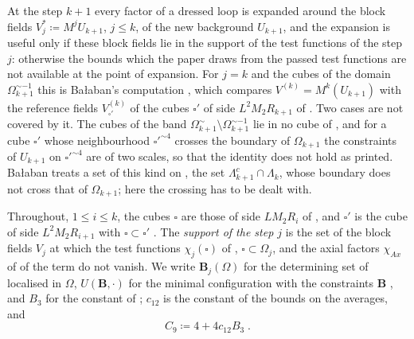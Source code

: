 \documentclass[11pt]{preprint}
\numberwithin{equation}{section}
\theoremstyle{definition}
\theoremstyle{remark}
\theoremstyle{plain}
\begin{document}
At the step $k + 1$ every factor of a dressed loop is expanded around the block fields $V^*_j \coloneqq M^jU_{k+1}$, $j \leq k$, of the new background $U_{k+1}$, and the expansion is useful only if these block fields lie in the support of the test functions of the step $j$: otherwise the bounds which the paper draws from the passed test functions are not available at the point of expansion. For $j = k$ and the cubes of the domain $\Omega_{k+1}^{\sim-1}$ this is Ba{\l}aban's computation \cite[(3.16)--(3.19), pp.~268--269]{BalabanCRE}, which compares $V^{(k)} = M^k(U_{k+1})$ with the reference fields $V^{(k)}_{\square'}$ of the cubes $\square'$ of side $L^2M_2R_{k+1}$ of \cite[(3.16)]{BalabanCRE}. Two cases are not covered by it. The cubes of the band $\Omega_{k+1}^\sim \setminus \Omega_{k+1}^{\sim-1}$ lie in no cube of \cite[(3.16)]{BalabanCRE}, and for a cube $\square'$ whose neighbourhood $\square'^{\sim4}$ crosses the boundary of $\Omega_{k+1}$ the constraints of $U_{k+1}$ on $\square'^{\sim4}$ are of two scales, so that the identity \cite[(3.17)]{BalabanCRE} does not hold as printed. Ba{\l}aban treats a set of this kind on \cite[p.~269]{BalabanCRE}, the set $\Lambda_{k+1}^c \cap \Lambda_k$, whose boundary does not cross that of $\Omega_{k+1}$; here the crossing has to be dealt with.

Throughout, $1 \leq i \leq k$, the cubes $\square$ are those of side $LM_2R_i$ of \cite[(2.17), p.~257]{BalabanCRE}, and $\square'$ is the cube of side $L^2M_2R_{i+1}$ with $\square \subset \square'$ \cite[p.~266]{BalabanCRE}. The \emph{support of the step $j$} is the set of the block fields $V_j$ at which the test functions $\chi_j(\square)$ of \cite[(2.17)]{BalabanCRE}, $\square \subset \Omega_j$, and the axial factors $\chi_{Ax}$ of \cite[(3.9), p.~266]{BalabanCRE} of the term do not vanish. We write $\mathbf B_j(\Omega)$ for the determining set of \cite[p.~256]{BalabanCRE} localised in $\Omega$, $U(\mathbf B, \cdot)$ for the minimal configuration with the constraints $\mathbf B$ \cite[(2.13), p.~257]{BalabanCRE}, and $B_3$ for the constant of \cite[Theorem~1, p.~279]{BalabanVAR}; $c_{12}$ is the constant of the bounds \cite[(159)--(163), p.~42]{BalabanAVG} on the averages, and
\begin{equation}\label{eq:band-constant}
    C_9 \coloneqq 4 + 4c_{12}B_3\;.
\end{equation}
\end{document}
